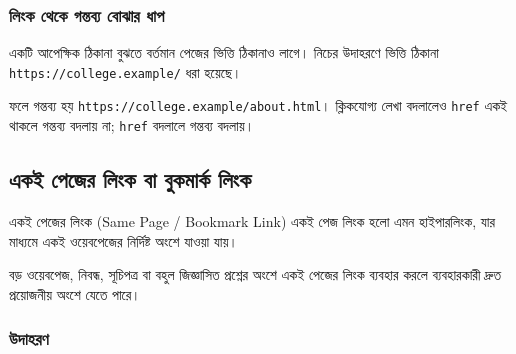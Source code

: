 \subsubsection{লিংক থেকে গন্তব্য বোঝার ধাপ}
একটি আপেক্ষিক ঠিকানা বুঝতে বর্তমান পেজের ভিত্তি ঠিকানাও লাগে। নিচের উদাহরণে ভিত্তি ঠিকানা \texttt{https://college.example/} ধরা হয়েছে।
\begin{center}
\end{center}
ফলে গন্তব্য হয় \texttt{https://college.example/about.html}। ক্লিকযোগ্য লেখা বদলালেও \texttt{href} একই থাকলে গন্তব্য বদলায় না; \texttt{href} বদলালে গন্তব্য বদলায়।



\subsection{একই পেজের লিংক বা বুকমার্ক লিংক}

\begin{definitionbox}{একই পেজের লিংক (Same Page / Bookmark Link)}
একই পেজ লিংক হলো এমন হাইপারলিংক, যার মাধ্যমে একই ওয়েবপেজের নির্দিষ্ট অংশে যাওয়া যায়।
\end{definitionbox}

বড় ওয়েবপেজ, নিবন্ধ, সূচিপত্র বা বহুল জিজ্ঞাসিত প্রশ্নের অংশে একই পেজের লিংক ব্যবহার করলে ব্যবহারকারী দ্রুত প্রয়োজনীয় অংশে যেতে পারে।

\subsubsection{উদাহরণ}

